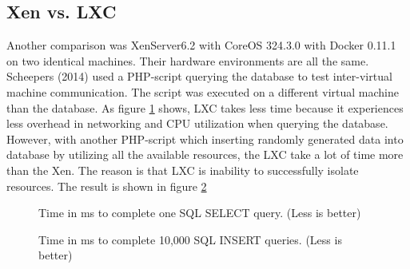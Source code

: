 \documentclass{sig-alternate}
\begin{document}
\subsection{Xen vs. LXC}

Another comparison was XenServer6.2 with CoreOS 324.3.0 with Docker 0.11.1 on two identical machines. Their hardware environments are all the same. Scheepers (2014) \cite{vdcp:sche} used a PHP-script querying the database to test inter-virtual machine communication. The script was executed on a different virtual machine than the database. As figure \ref{fig:xen_core} shows, LXC takes less time because it experiences less overhead in networking and CPU utilization when querying the database. However, with another PHP-script which inserting randomly generated data into database by utilizing all the available resources, the LXC take a lot of time more than the Xen. The reason is that LXC is inability to successfully isolate resources. The result is shown in figure \ref{fig:xen_core2} 

\begin{figure}[htb]
\centering
{}
\caption{Time in ms to complete one SQL SELECT query. (Less is better)\cite{vdcp:sche}}
\label{fig:xen_core}
\vskip -6pt
\end{figure}

\begin{figure}[htb]
\centering
{}
\caption{Time in ms to complete 10,000 SQL INSERT queries. (Less is better)\cite{vdcp:sche}}
\label{fig:xen_core2}
\vskip -6pt
\end{figure}
\end{document}
